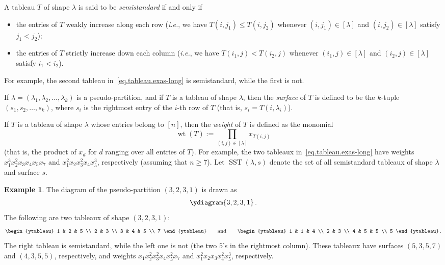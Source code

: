 \documentclass[reqno]{amsart}
\newcommand{\0}{\phantom{c}}
\newcommand{\diag}[1]{\left[#1\right]} %
\DeclareMathOperator{\wt}{wt} %
\DeclareMathOperator{\SST}{SST} %
\let\prodnonlimits\prod
\renewcommand{\prod}{\prodnonlimits\limits}
\newenvironment{verlong}{}{}
\newcommand{\tup}[1]{\left( #1 \right)}
\newcommand{\ive}[1]{\left[ #1 \right]}
\newcommand{\defn}[1]{{\color{darkred}\emph{#1}}} %
\theoremstyle{plain}
\theoremstyle{definition}
\newtheorem{example}[thm]{Example}
\numberwithin{equation}{section}
\begin{document}
A tableau $T$ of shape $\lambda$ is said to be \defn{semistandard} if and only if
\begin{itemize}
\item the entries of $T$ weakly increase along each row (\textit{i.e.}, we have $T(i,j_1) \leq T(i,j_2)$ whenever $(i,j_1) \in \diag{\lambda}$ and $(i,j_2) \in \diag{\lambda}$ satisfy $j_1 < j_2$);

\item the entries of $T$ strictly increase down each column (\textit{i.e.}, we have $T(i_1,j) < T(i_2,j)$ whenever $(i_1,j) \in \diag{\lambda}$ and $(i_2,j) \in \diag{\lambda}$ satisfy $i_1 < i_2$).
\end{itemize}

\begin{verlong}
For example, the second tableau in~\eqref{eq.tableau.exas-long} is semistandard, while the first is not.
\end{verlong}

If $\lambda = \tup{\lambda_1, \lambda_2, \dotsc, \lambda_k}$ is a pseudo-partition, and if $T$ is a tableau of shape $\lambda$,
then the \defn{surface} of $T$ is defined to be the $k$-tuple $(s_1, s_2, \dotsc, s_k)$, where $s_i$ is the rightmost entry of the $i$-th row of $T$ (that is, $s_i = T(i,\lambda_i)$).

If $T$ is a tableau of shape $\lambda$ whose entries belong to $\ive{n}$, then the \defn{weight} of $T$ is defined as the monomial
\[
\wt(T) := \prod_{(i,j) \in \diag{\lambda}} x_{T(i,j)}
\]
(that is, the product of $x_{d}$ for $d$ ranging over all entries of $T$).
\begin{verlong}
For example, the two tableaux in~\eqref{eq.tableau.exas-long} have weights $x_1^{3}x_2^{2}x_{3}x_{4}x_{5}x_{7}$ and $x_1^{2}x_2x_{3}^{2}x_{4}x_{5}^{3}$, respectively (assuming that $n \geq 7$).
\end{verlong}
Let $\SST(\lambda, s)$ denote the set of all semistandard tableaux of shape $\lambda$ and surface $s$.

\begin{example}
The diagram of the pseudo-partition $\tup{3,2,3,1}$ is drawn as
\[
\ydiagram{3,2,3,1}\,.
\]
The following are two tableaux of shape $\tup{3,2,3,1}$:
\[
\begin{ytableau} 1 & 2 & 5 \\ 2 & 3 \\ 3 & 4 & 5 \\ 7 \end{ytableau}\qquad
\text{and}\qquad
\begin{ytableau} 1 & 1 & 4 \\ 2 & 3 \\ 4 & 5 & 5 \\ 5 \end{ytableau}\,.
\]
The right tableau is semistandard, while the left one is not (the two $5$'s in the rightmost column).
These tableaux have surfaces $(5,3,5,7)$ and $(4,3,5,5)$, respectively, and weights $x_1 x_2^2 x_3^2 x_4 x_5^2 x_7$ and $x_1^2 x_2 x_3 x_4^2 x_5^3$, respectively.
\end{example}
\end{document}

